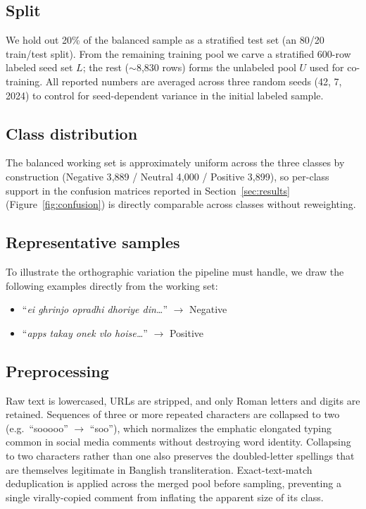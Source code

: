 \documentclass[conference]{IEEEtran}
\begin{document}
\subsection{Split}

We hold out 20\% of the balanced sample as a stratified test set (an 80/20
train/test split). From the remaining training pool we carve a stratified
600-row labeled seed set $L$; the rest ($\sim$8{,}830 rows) forms the
unlabeled pool $U$ used for co-training. All reported numbers are averaged
across three random seeds (42, 7, 2024) to control for seed-dependent variance
in the initial labeled sample.

\subsection{Class distribution}

The balanced working set is approximately uniform across the three classes by
construction (Negative 3{,}889 / Neutral 4{,}000 / Positive 3{,}899), so
per-class support in the confusion matrices reported in
Section~\ref{sec:results} (Figure~\ref{fig:confusion}) is directly comparable
across classes without reweighting.

\subsection{Representative samples}

To illustrate the orthographic variation the pipeline must handle, we draw the
following examples directly from the working set:

\begin{itemize}
  \item ``\emph{ei ghrinjo opradhi dhoriye din\ldots}'' $\rightarrow$ Negative
  \item ``\emph{apps takay onek vlo hoise\ldots}'' $\rightarrow$ Positive
\end{itemize}

\subsection{Preprocessing}

Raw text is lowercased, URLs are stripped, and only Roman letters and digits
are retained. Sequences of three or more repeated characters are collapsed to
two (e.g.\ ``sooooo'' $\rightarrow$ ``soo''), which normalizes the emphatic
elongated typing common in social media comments without destroying word
identity. Collapsing to two characters rather than one also preserves the
doubled-letter spellings that are themselves legitimate in Banglish
transliteration.
Exact-text-match deduplication is applied across the merged pool before
sampling, preventing a single virally-copied comment from inflating the
apparent size of its class.
\end{document}
